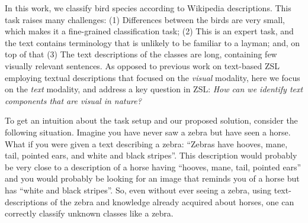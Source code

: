 \documentclass[11pt,a4paper]{article}
\newcommand\gal[1]{\textcolor{bright}{\textbf{GAL:} #1 }}
\newcommand\tzuf[1]{\textcolor{blue}{\textbf{TZUF:} #1 }}
\begin{document}
In this work, we classify bird species according to Wikipedia descriptions.
This task raises many challenges: 
(1) Differences between the birds are very small, which makes it a fine-grained classification task; (2) This is an expert task, %
and the text contains terminology that is unlikely to be familiar to a layman; and, on top of that
(3) The text descriptions of the classes are long, containing few visually relevant sentences. 
%
%
As opposed to previous work on text-based ZSL employing textual descriptions \citep{zhu2018generative,elhoseiny2017link} that focused on the {\em visual} modality, here we focus on the {\em text} modality, and address a key question in ZSL: \textit {How can we identify text components that are visual in nature?}


To get an intuition about the task setup and our proposed solution, consider the following situation.
Imagine you have never saw a zebra but have seen a horse. What if you were given a text describing a zebra: \enquote{Zebras have hooves, mane, tail, pointed ears, and white and black stripes}. This description would probably be very close to a description of a horse having \enquote{hooves, mane, tail, pointed ears} and you would probably be looking for an image that reminds you of a horse but has \enquote{white and black stripes}. So, even without ever seeing a zebra, using text-descriptions of the zebra and knowledge already acquired about horses, one can correctly classify unknown classes like a zebra.
\end{document}
